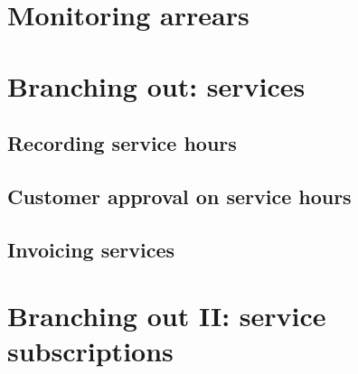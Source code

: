 


\chapter{Monitoring arrears}
\label{cha:monitoring-arrears}


\chapter{Branching out: services}



\section{Recording service hours}

\section{Customer approval on service hours}

\section{Invoicing services}

\chapter{Branching out II: service subscriptions}


